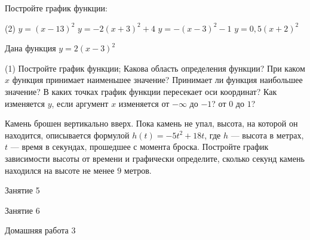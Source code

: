 \begin{homework}[number=2]
	\begin{listofex}
		\item Постройте график функции:
		\begin{tasks}(2)
			\task \( y=(x-13)^2 \)
			\task \( y=-2(x+3)^2+4 \)
			\task \( y=-(x-3)^2-1 \)
			\task \( y=0,5(x+2)^2 \)
		\end{tasks}
		\item Дана функция \( y=2(x-3)^2 \)
		\begin{tasks}(1)
			\task Постройте график функции;
			\task Какова область определения функции?
			\task При каком \( x \) функция принимает наименьшее значение? Принимает ли функция наибольшее значение?
			\task В каких точках график функции пересекает оси координат?
			\task Как изменяется \( y \), если аргумент \( x \) изменяется от \( -\infty  \) до \( -1 \)? от \( 0 \) до \( 1 \)?
		\end{tasks}
		\item Камень брошен вертикально вверх. Пока камень не упал, высота, на которой он находится, описывается формулой \( h(t)=-5t^2+18t \), где \( h \) --- высота в метрах, \( t \) --- время в секундах, прошедшее с момента броска. Постройте график зависимости высоты от времени и графически определите, сколько секунд камень находился на высоте не менее \( 9 \) метров.
	\end{listofex}
\end{homework}

\begin{class}[number=5]
	\begin{listofex}
		\item Занятие 5
	\end{listofex}
\end{class}

\begin{class}[number=6]
	\begin{listofex}
		\item Занятие 6
	\end{listofex}
\end{class}

\begin{homework}[number=3]
	\begin{listofex}
		\item Домашняя работа 3
	\end{listofex}
\end{homework}

